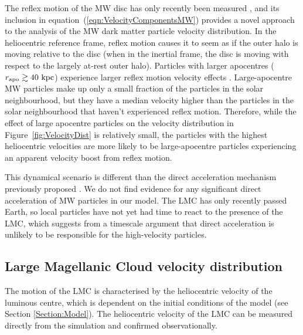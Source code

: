 \documentclass[fleqn,usenatbib]{mnras}
\newcommand{\kpc}{{\rm ~kpc}}	%
\begin{document}
The reflex motion of the MW disc has only recently been measured \citep{Petersen_2021_reflex_motion}, and its inclusion in equation~(\ref{eqn:VelocityComponentsMW}) provides a novel approach to the analysis of the MW dark matter particle velocity distribution. In the heliocentric reference frame, reflex motion causes it to seem as if the outer halo is moving relative to the disc (when in the inertial frame, the disc is moving with respect to the largely at-rest outer halo). Particles with larger apocentres ($r_{\rm apo} \gtrsim 40 \kpc$) experience larger reflex motion velocity effects  \citep{Petersen..reflexmotion..2020}.
Large-apocentre MW particles make up only a small fraction of the particles in the solar neighbourhood, but they have a median velocity higher than the particles in the solar neighbourhood that haven’t experienced reflex motion. Therefore, while the effect of large apocentre particles on the velocity distribution in Figure~\ref{fig:VelocityDist} is relatively small, the particles with the highest heliocentric velocities are more likely to be large-apocentre particles experiencing an apparent velocity boost from reflex motion.

This dynamical scenario is different than the direct acceleration mechanism previously proposed \citep{Besla_2019}. We do not find evidence for any significant direct acceleration of MW particles in our model. The LMC has only recently passed Earth, so local particles have not yet had time to react to the presence of the LMC, which suggests from a timescale argument that direct acceleration is unlikely to be responsible for the high-velocity particles.


\vspace{-0.2cm}
\subsection{Large Magellanic Cloud velocity distribution}
\label{subsubsec:LMCdist}

The motion of the LMC is characterised by the heliocentric velocity of the luminous centre, which is dependent on the initial conditions of the model (see Section \ref{Section:Model}). The heliocentric velocity of the LMC can be measured directly from the simulation and confirmed observationally. 
\end{document}
